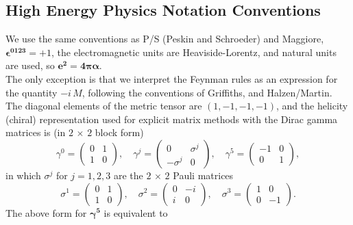 \documentclass[11pt]{article}
\begin{document}
\subsection{High Energy Physics Notation Conventions}
We use the same conventions as P/S (Peskin and Schroeder) and
  Maggiore, {\large $\mathbf{\boldsymbol{\epsilon} ^{0 1 2 3}} = + 1$}, 
  the electromagnetic units are Heaviside-Lorentz, and natural units
  are used, so {\large $\mathbf{e^2 = 4 \boldsymbol{\pi \alpha}}$}.\\
  
\noindent The only exception is that we interpret the Feynman rules as
 an expression for the quantity {\large $-i\,M$},
 following the conventions of Griffiths, and Halzen/Martin.\\
 
\noindent The diagonal elements of the metric
  tensor are {\large $(1,-1,-1,-1)$}, and the helicity (chiral) representation
  used for explicit matrix methods with the Dirac gamma matrices is
  (in $2\,\times \,2$ block form)
\Large
\begin{equation}
 \gamma^{0} = \begin{pmatrix} 0 & 1 \\ 1 & 0 \end{pmatrix}, \quad
 \gamma^{j} = \begin{pmatrix} 0 & \sigma^{j} \\ -\sigma^{j} & 0 \end{pmatrix}, \quad
  \gamma^{5} = \begin{pmatrix} -1 & 0 \\ 0 & 1 \end{pmatrix},
\end{equation}
\normalsize
  in which {\large $\sigma^{j}$} for {\large $ j = 1, 2, 3$} are the $2\,\times \,2$ Pauli matrices
\Large
\begin{equation}
 \sigma^{1} = \begin{pmatrix} 0 & 1 \\ 1 & 0 \end{pmatrix}, \quad
 \sigma^{2} = \begin{pmatrix} 0 & -i \\ i & 0 \end{pmatrix}, \quad
  \sigma^{3} = \begin{pmatrix} 1 & 0 \\ 0 & -1 \end{pmatrix}.
\end{equation}
\normalsize
The above form for {\large $\boldsymbol{\gamma^{5}}$} is equivalent to
\end{document}
